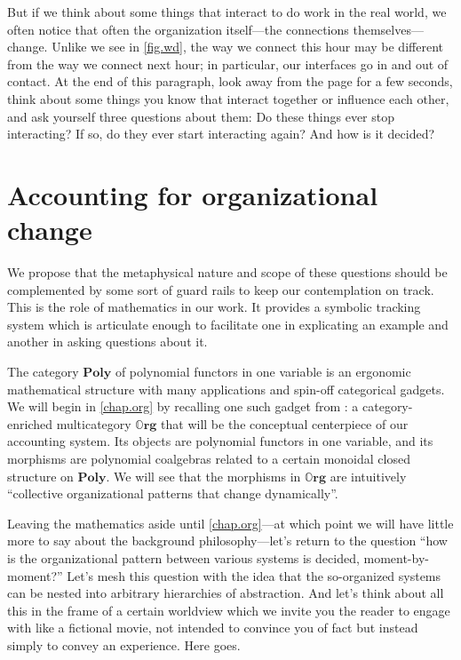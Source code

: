 \documentclass[11pt, one side, article]{memoir}
\theoremstyle{definition}
\theoremstyle{plain}
\newcommand{\Cat}[1]{\mathbf{#1}}%
\newcommand{\poly}{\Cat{Poly}}
\newcommand{\0}{\textsf{0}}
\newcommand{\1}{\tn{\textsf{1}}}
\newcommand{\org}{{\mathbb{O}\Cat{rg}}}
\begin{document}
But if we think about some things that interact to do work in the real world, we often notice that often the organization itself---the connections themselves---change. Unlike we see in \cref{fig.wd}, the way we connect this hour may be different from the way we connect next hour; in particular, our interfaces go in and out of contact. At the end of this paragraph, look away from the page for a few seconds, think about some things you know that interact together or influence each other, and ask yourself three questions about them: Do these things ever stop interacting? If so, do they ever start interacting again? And how is it decided? 

\section{Accounting for organizational change}

We propose that the metaphysical nature and scope of these questions should be complemented by some sort of guard rails to keep our contemplation on track. This is the role of mathematics in our work. It provides a symbolic tracking system which is articulate enough to facilitate one in explicating an example and another in asking questions about it.

The category $\poly$ of polynomial functors in one variable is an ergonomic mathematical structure with many applications and spin-off categorical gadgets. We will begin in \cref{chap.org} by recalling one such gadget from \cite{spivak2021learners}: a category-enriched multicategory $\org$ that will be the conceptual centerpiece of our accounting system. Its objects are polynomial functors in one variable, and its morphisms are polynomial coalgebras related to a certain monoidal closed structure on $\poly$. We will see that the morphisms in $\org$ are intuitively ``collective organizational patterns that change dynamically''.

Leaving the mathematics aside until \cref{chap.org}---at which point we will have little more to say about the background philosophy---let's return to the question ``how is the organizational pattern between various systems is decided, moment-by-moment?'' Let's mesh this question with the idea that the so-organized systems can be nested into arbitrary hierarchies of abstraction. And let's think about all this in the frame of a certain worldview which we invite you the reader to engage with like a fictional movie, not intended to convince you of fact but instead simply to convey an experience. Here goes.
\end{document}
